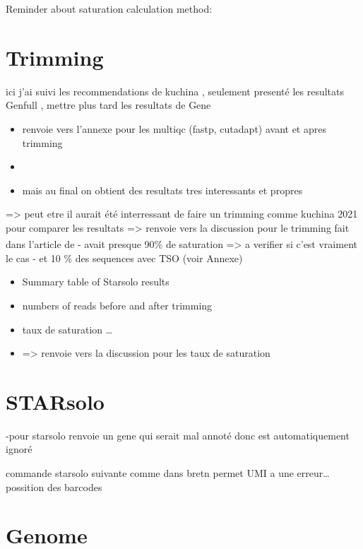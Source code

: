 \documentclass[
  11pt,
  a4paper,
]{report}
\providecommand{\tightlist}{%
  \setlength{\itemsep}{0pt}\setlength{\parskip}{0pt}}\usepackage{longtable,booktabs,array}
\begin{document}
Reminder about saturation calculation method:

\section{Trimming}\label{trimming}

ici j'ai suivi les recommendations de kuchina , seulement presenté les
resultats Genfull , mettre plus tard les resultats de Gene

\begin{itemize}
\tightlist
\item
  renvoie vers l'annexe pour les multiqc (fastp, cutadapt) avant et
  apres trimming
\item
\item
  mais au final on obtient des resultats tres interessants et propres
\end{itemize}

=\textgreater{} peut etre il aurait été interressant de faire un
trimming comme kuchina 2021 pour comparer les resultats =\textgreater{}
renvoie vers la discussion pour le trimming fait dans l'article
de\textsuperscript{} - avait presque 90\%
de saturation =\textgreater{} a verifier si c'est vraiment le cas - et
10 \% des sequences avec TSO (voir Annexe)

\begin{itemize}
\tightlist
\item
  Summary table of Starsolo results
\item
  numbers of reads before and after trimming
\item
  taux de saturation \ldots{}
\item
  =\textgreater{} renvoie vers la discussion pour les taux de saturation
\end{itemize}

\section{STARsolo}\label{starsolo}

-pour starsolo renvoie un gene qui serait mal annoté donc est
automatiquement ignoré

commande starsolo suivante comme dans bretn permet UMI a une
erreur\ldots{} possition des barcodes

\section{Genome}\label{genome}
\end{document}
